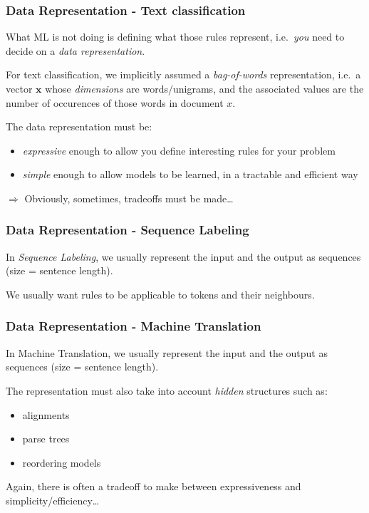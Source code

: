 \documentclass[usenames,dvipsnames]{beamer}
\newcommand{\x}{\mathbf{x}}
\newcommand{\voc}[1]{\emph{\color{ForestGreen}#1}}
\begin{document}
\begin{frame}\frametitle{Data Representation - Text classification}

What ML is not doing is defining what those rules represent,
i.e.\ \emph{you} need to decide on a \voc{data representation}.

\vspace{0.4cm}
For text classification, we implicitly assumed a \voc{bag-of-words} representation, i.e.\
a vector $\x$ whose \voc{dimensions} are words/unigrams, and the
associated values are the number of occurences of those words in
document $x$.

\vspace{0.4cm}
The data representation must be:
\begin{itemize}
\item \voc{expressive} enough to allow you define interesting rules
  for your problem
\item \voc{simple} enough to allow models to be learned\pause, in a tractable and
  efficient way
\end{itemize}
$\Rightarrow$ Obviously, sometimes, tradeoffs must be made\ldots

\end{frame}


\begin{frame}\frametitle{Data Representation - Sequence Labeling}

\vspace{0.4cm}
In \voc{Sequence Labeling}, we usually represent the input and the output
as sequences (size = sentence length).

\vspace{0.4cm}
We usually want rules to be applicable to tokens and their neighbours.

\end{frame}


\begin{frame}\frametitle{Data Representation - Machine Translation}

In Machine Translation, we usually represent the input and the output
as sequences (size = sentence length).

\vspace{0.4cm}
The representation must also take into account \voc{hidden} structures such
as:
\begin{itemize}
\item alignments
\item parse trees
\item reordering models
\end{itemize}

\vspace{0.4cm}
Again, there is often a tradeoff to make between expressiveness and
simplicity/efficiency\ldots

\end{frame}
\end{document}
